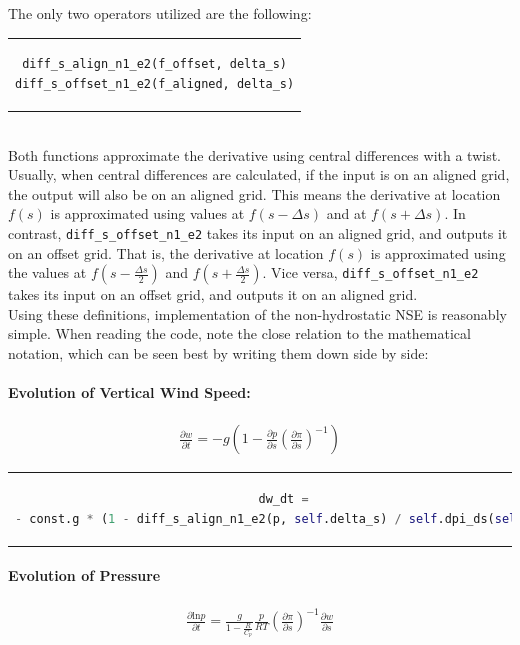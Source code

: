 The only two operators utilized are the following:\\
\begin{tabular}{c}
\begin{lstlisting}[language=Python]
diff_s_align_n1_e2(f_offset, delta_s)
diff_s_offset_n1_e2(f_aligned, delta_s)
\end{lstlisting}
\end{tabular}\\
Both functions approximate the derivative using central differences with a twist.
Usually, when central differences are calculated, if the input is on an aligned grid, the output will also be on an aligned grid.
This means the derivative at location $f(s)$ is approximated using values at $f(s-\Delta s)$ and at $f(s+\Delta s)$.
In contrast, \texttt{diff\_s\_offset\_n1\_e2} takes its input on an aligned grid, and outputs it on an offset grid.
That is, the derivative at location $f(s)$ is approximated using the values at $f(s-\frac{\Delta s}{2})$ and $f(s+\frac{\Delta s}{2})$.
Vice versa, \texttt{diff\_s\_offset\_n1\_e2} takes its input on an offset grid, and outputs it on an aligned grid.\\
Using these definitions, implementation of the non-hydrostatic NSE is reasonably simple.
When reading the code, note the close relation to the mathematical notation, which can be seen best by writing them down side by side:
\paragraph{Evolution of Vertical Wind Speed:}
\begin{align*}
\frac{\partial w}{\partial t} = -g\left(1 - \frac{\partial p}{\partial s}\left(\frac{\partial \pi}{\partial s}\right)^{-1}\right)
\end{align*}
\begin{center}
\begin{tabular}{c}
\begin{lstlisting}[language=Python]
dw_dt =
- const.g * (1 - diff_s_align_n1_e2(p, self.delta_s) / self.dpi_ds(self.s))
\end{lstlisting}
\end{tabular}
\end{center}

\paragraph{Evolution of Pressure}
\begin{align*}
\frac{\partial \text{ln}p}{\partial t} = \frac{g}{1- \frac{R}{C_p}} \frac{p}{RT}\left(\frac{\partial \pi}{\partial s}\right)^{-1} \frac{\partial w}{\partial s}
\end{align*}

